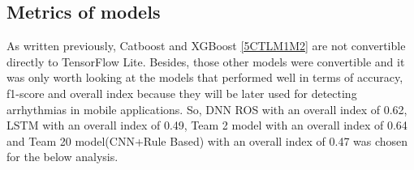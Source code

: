 \subsection{Metrics of models}

As written previously, Catboost and XGBoost \ref{5CTLM1M2} are not convertible directly to TensorFlow Lite. Besides, those other models were convertible and it was only worth looking at the models that performed well in terms of accuracy, f1-score and overall index because they will be later used for detecting arrhythmias in mobile applications. So, DNN ROS with an overall index of 0.62, LSTM with an overall index of 0.49, Team 2 model with an overall index of 0.64 and Team 20 model(CNN+Rule Based) with an overall index of 0.47 was chosen for the below analysis. 


\begin{figure}[H]
\\

\end{figure}
